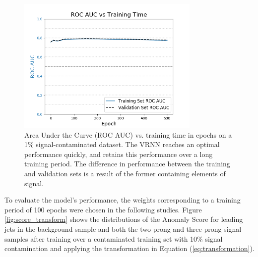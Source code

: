 \documentclass[11pt, a4paper]{article}
\begin{document}
\begin{figure}[H]
	\begin{center}
		\includegraphics[width=250pt]{imgs/auc_vs_epoch_1p0_SaveForPaper.png}
	\end{center}
	\caption{Area Under the Curve (ROC AUC) vs. training time in epochs on a 1\% signal-contaminated dataset. The VRNN reaches an optimal performance quickly, and retains this performance over a long training period. The difference in performance between the training and validation sets is a result of the former containing elements of signal.}
	\label{fig:auc_vs_epoch}
\end{figure}


To evaluate the model's performance, the weights corresponding to a training period of 100 epochs were chosen in the following studies. Figure \ref{fig:score_transform} shows the distributions of the Anomaly Score for leading jets in the background sample and both the two-prong and three-prong signal samples after training over a contaminated training set with 10\% signal contamination and applying the transformation in Equation (\ref{eq:transformation}).
\end{document}
